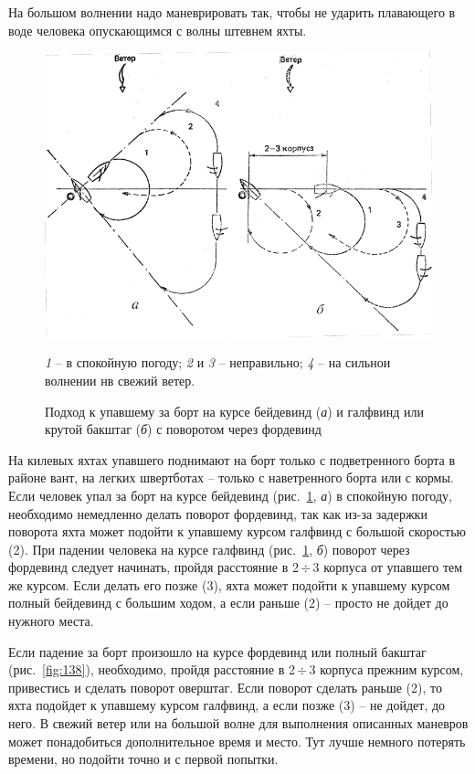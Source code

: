 \documentclass[a4paper, 12pt, twoside, final, book, russian, fittopage, cyremdash]{ncc}
\newcommand{\otdo}{\,\ensuremath{\div}\,}
\newcommand{\ris}[1]{\ref{fig:#1}}
\begin{document}
На большом волнении надо маневрировать так, чтобы не ударить плавающего в воде человека опускающимся с волны штевнем яхты.

\begin{figure}[htb]
  \centering{}
  \includegraphics[scale=1.3]{0137P}
  \caption{Подход к упавшему за борт на курсе бейдевинд (\textit{а}) и галфвинд или крутой бакштаг (\textit{б}) с поворотом через фордевинд}
  \label{fig:137}
  \small
  \centering{}
  \textit{1} \--- в спокойную погоду; \textit{2} и \textit{3} \--- неправильно; \textit{4} \--- на сильнои волнении нв свежий ветер.
\end{figure}

На килевых яхтах упавшего поднимают на борт только с подветренного борта в районе вант, на легких швертботах \--- только с наветренного борта или с кормы. Если человек упал за борт на курсе бейдевинд (рис.~\ris{137}, \textit{а}) в спокойную погоду, необходимо немедленно делать поворот фордевинд, так как из-за задержки поворота яхта может подойти к упавшему курсом галфвинд с большой скоростью (2). При падении человека на курсе галфвинд (рис.~\ris{137}, \textit{б}) поворот через фордевинд следует начинать, пройдя расстояние в 2\otdo 3 корпуса от упавшего тем же курсом. Если делать его позже (3), яхта может подойти к упавшему курсом полный бейдевинд с большим ходом, а если раньше (2) \--- просто не дойдет до нужного места.

Если падение за борт произошло на курсе фордевинд или полный бакштаг (рис.~\ris{138}), необходимо, пройдя расстояние в 2\otdo 3 корпуса прежним курсом, привестись и сделать поворот оверштаг. Если поворот сделать раньше (2), то яхта подойдет к упавшему курсом галфвинд, а если позже (3) \--- не дойдет, до него. В свежий ветер или на большой волне для выполнения описанных маневров может понадобиться дополнительное время и место. Тут лучше немного потерять времени, но подойти точно и с первой попытки.
\end{document}
